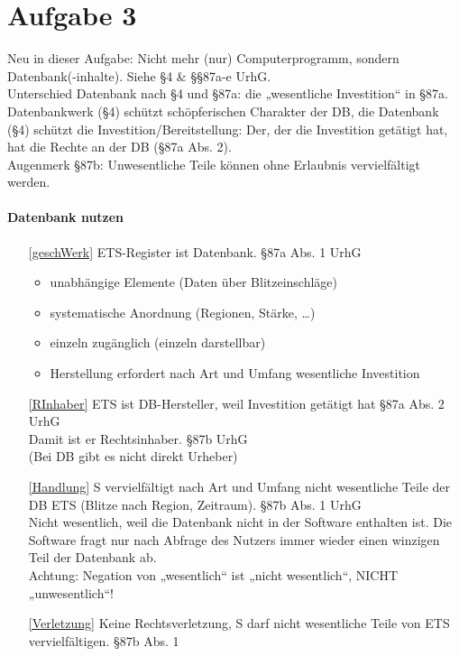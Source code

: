 \documentclass{scrreprt}
\begin{document}
\chapter{Aufgabe 3}
Neu in dieser Aufgabe: Nicht mehr (nur) Computerprogramm, sondern Datenbank(-inhalte). Siehe §4 \& §§87a-e UrhG.\\
Unterschied Datenbank nach §4 und §87a: die „wesentliche Investition“ in §87a.\\
Datenbankwerk (§4) schützt schöpferischen Charakter der DB, die Datenbank (§4) schützt die Investition/Bereitstellung: Der, der die Investition getätigt hat, hat die Rechte an der DB (§87a Abs. 2).\\
Augenmerk §87b: Unwesentliche Teile können ohne Erlaubnis vervielfältigt werden.
\subsubsection*{Datenbank nutzen}
\begin{enumerate}
\item[\ref{geschWerk}] ETS-Register ist Datenbank. \hfill §87a Abs. 1 UrhG
\begin{itemize}
\item unabhängige Elemente (Daten über Blitzeinschläge)
\item systematische Anordnung (Regionen, Stärke, …)
\item einzeln zugänglich (einzeln darstellbar)
\item Herstellung erfordert nach Art und Umfang wesentliche Investition
\end{itemize}
\item[\ref{RInhaber}] ETS ist DB-Hersteller, weil Investition getätigt hat \hfill §87a Abs. 2 UrhG\\
Damit ist er Rechtsinhaber. \hfill §87b UrhG\\
(Bei DB gibt es nicht direkt Urheber)
\item[\ref{Handlung}] S vervielfältigt nach Art und Umfang nicht wesentliche Teile der DB ETS (Blitze nach Region, Zeitraum). \hfill §87b Abs. 1 UrhG\\
Nicht wesentlich, weil die Datenbank nicht in der Software enthalten ist. Die Software fragt nur nach Abfrage des Nutzers immer wieder einen winzigen Teil der Datenbank ab.\\
Achtung: Negation von „wesentlich“ ist „nicht wesentlich“, NICHT „unwesentlich“!
\item[\ref{Verletzung}] Keine Rechtsverletzung, S darf nicht wesentliche Teile von ETS vervielfältigen. \hfill §87b Abs. 1
\end{enumerate}
\end{document}

